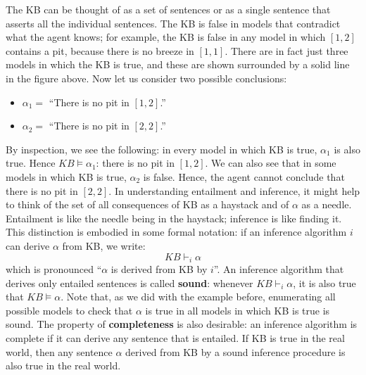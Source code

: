 The KB can be thought of as a set of sentences or as a single sentence that asserts all the individual sentences. The KB is false in models that contradict what the agent knows; for example, the KB is false in any model in which $[1,2]$ contains a pit, because there is no breeze in $[1,1]$. There are in fact just three models in which the KB is true, and these are shown surrounded by a solid line in the figure above.\newline\newline
Now let us consider two possible conclusions:
\begin{itemize}
    \item $\alpha_1 = $ “There is no pit in $[1,2]$.”

    \item $\alpha_2 = $ “There is no pit in $[2,2]$.”

\end{itemize}
By inspection, we see the following: in every model in which KB is true, $\alpha_1$ is also true. Hence $KB \vDash \alpha_1$: there is no pit in $[1,2]$. We can also see that in some models in which KB is true, $\alpha_2$ is false. Hence, the agent cannot conclude that there is no pit in $[2,2]$.\newline\newline
In understanding entailment and inference, it might help to think of the set of all consequences of KB as a haystack and of $\alpha$ as a needle. Entailment is like the needle being in the haystack; inference is like finding it. This distinction is embodied in some formal notation: if an inference algorithm $i$ can derive $\alpha$ from KB, we write:
\[KB \vdash_i \alpha\]
which is pronounced “$\alpha$ is derived from KB by $i$”.\newline\newline
An inference algorithm that derives only entailed sentences is called \textbf{sound}: whenever $KB \vdash_i \alpha$, it is also true that $KB \vDash \alpha$. Note that, as we did with the example before, enumerating all possible models to check that $\alpha$ is true in all models in which KB is true is sound. The property of \textbf{completeness} is also desirable: an inference algorithm is complete if it can derive any sentence that is entailed.\newline\newline
If KB is true in the real world, then any sentence $\alpha$ derived from KB by a sound inference procedure is also true in the real world.

